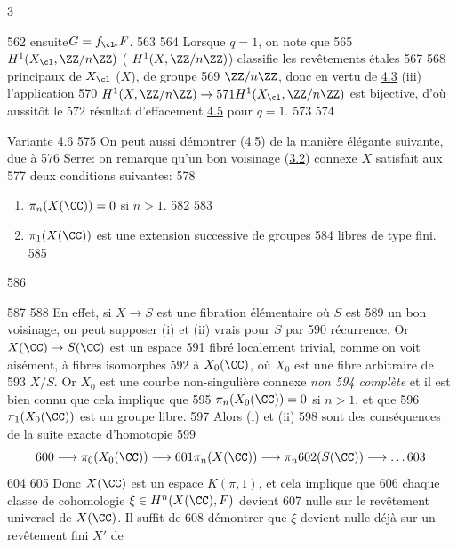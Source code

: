 3	\documentclass[10pt]{../fichiers-configuration-latex/smfart}
\begin{document}
   562	ensuite\pageoriginale $G=f_{\cl\!\ast}F$. %
   563	                                %
   564	Lorsque $q=1$, on note que
   565	$H^1(X_{\cl},\ZZ/n \ZZ)$ (	$H^1(X,\ZZ/n\ZZ)$) classifie les revêtements étales %
   567	                                %
   568	principaux de $X_{\cl}$ (\resp $X$), de groupe
   569	$\ZZ/n\ZZ$, donc en vertu de \hyperref[XI.thm4.3]{4.3} (iii) l'application
   570	$H^1(X,\ZZ/n\ZZ)\rightarrow
   571	H^1(X_{\cl},\ZZ/n\ZZ)$ est bijective, d'où aussitôt le
   572	résultat d'effacement \hyperref[XI.lem4.5]{4.5} pour $q=1$.
   573	
   574	\begin{enonce*}[remark]{Variante 4.6}
   575	On peut aussi démontrer (\hyperref[XI.lem4.5]{4.5}) de la manière élégante suivante, due à
   576	Serre: on remarque qu'un bon voisinage (\hyperref[XI.def3.2]{3.2}) connexe $X$ satisfait aux
   577	deux conditions suivantes:
   578	\begin{enumerate}
   579	\renewcommand{\theenumi}{\roman{enumi}}
   580	\renewcommand{\labelenumi}{(\theenumi)}
   581	\item $\pi_n(X(\CC))=0$ si $n>1$.
   582	
   583	\item $\pi_1(X(\CC))$ est une extension successive de groupes
   584	libres de type fini.
   585	\end{enumerate}
   586	\end{enonce*}
   587	
   588	En effet, si $X\rightarrow S$ est une fibration élémentaire où $S$ est
   589	un bon voisinage, on peut supposer (i) et (ii) vrai{s} pour $S$ par
   590	récurrence. Or $X(\CC)\rightarrow S(\CC)$ est un espace
   591	fibré localement trivial, comme on voit aisément, à fibres isomorphes
   592	à $X_0(\CC)$, où $X_0$ est une fibre arbitraire de
   593	$X/S$. Or $X_0$ est une courbe non-singulière connexe \emph{non
   594	complète} et il est bien connu que cela implique que
   595	$\pi_n(X_0(\CC))=0$ si $n>1$, et que
   596	$\pi_1(X_0(\CC))$ est un groupe libre. %
   597	Alors (i) et (ii)
   598	sont des conséquences de la suite exacte d'homotopie
   599	$$
   600	\longrightarrow \pi_0(X_0(\CC))\longrightarrow
   601	\pi_n (X(\CC))\longrightarrow \pi_n
   602	(S(\CC))\longrightarrow\ldots
   603	$$
   604	
   605	Donc $X(\CC)$ est un espace $K(\pi,1)$, et cela implique que
   606	chaque classe de cohomologie $\xi\in H^n(X(\CC),F)$ devient
   607	nulle sur le revêtement universel de $X(\CC)$. Il suffit de
   608	démontrer que $\xi$ devient nulle déjà sur un revêtement fini $X'$ de
\end{document}
